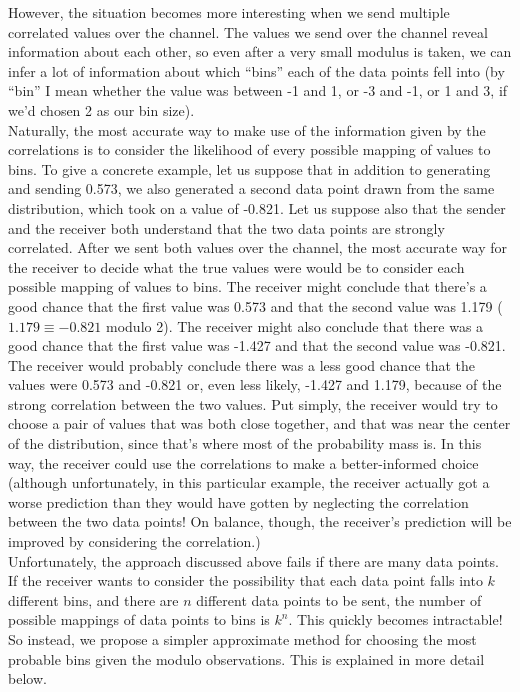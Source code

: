 \documentclass{amsart}
\begin{document}
However, the situation becomes more interesting when we send multiple correlated values over the channel. The values we send over the channel reveal information about each other, so even after a very small modulus is taken, we can infer a lot of information about which ``bins'' each of the data points fell into (by ``bin'' I mean whether the value was between -1 and 1, or -3 and -1, or 1 and 3, if we'd chosen 2 as our bin size). \\

Naturally, the most accurate way to make use of the information given by the correlations is to consider the likelihood of every possible mapping of values to bins. To give a concrete example, let us suppose that in addition to generating and sending 0.573, we also generated a second data point drawn from the same distribution, which took on a value of -0.821. Let us suppose also that the sender and the receiver both understand that the two data points are strongly correlated. After we sent both values over the channel, the most accurate way for the receiver to decide what the true values were would be to consider each possible mapping of values to bins. The receiver might conclude that there's a good chance that the first value was 0.573 and that the second value was 1.179 ($1.179 \equiv -0.821$ modulo 2). The receiver might also conclude that there was a good chance that the first value was -1.427 and that the second value was  -0.821. The receiver would probably conclude there was a less good chance that the values were 0.573 and -0.821 or, even less likely, -1.427 and 1.179, because of the strong correlation between the two values. Put simply, the receiver would try to choose a pair of values that was both close together, and that was near the center of the distribution, since that's where most of the probability mass is. In this way, the receiver could use the correlations to make a better-informed choice (although unfortunately, in this particular example, the receiver actually got a worse prediction than they would have gotten by neglecting the correlation between the two data points! On balance, though, the receiver's prediction will be improved by considering the correlation.) \\

Unfortunately, the approach discussed above fails if there are many data points. If the receiver wants to consider the possibility that each data point falls into $k$ different bins, and there are $n$ different data points to be sent, the number of possible mappings of data points to bins is $k^n$. This quickly becomes intractable! So instead, we propose a simpler approximate method for choosing the most probable bins given the modulo observations. This is explained in more detail below. \\
\end{document}
